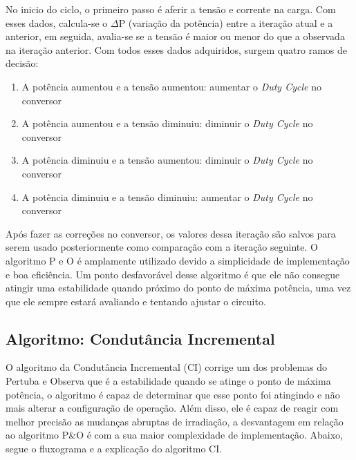 No inicio do ciclo, o primeiro passo é aferir a tensão e corrente na carga. Com esses dados, calcula-se o $\Delta$P (variação da potência) entre a iteração atual e a anterior, em seguida, avalia-se se a tensão é maior ou menor do que a observada na iteração anterior. Com todos esses dados adquiridos, surgem quatro ramos de decisão:
\begin{enumerate}
    \item A potência aumentou e a tensão aumentou: aumentar o \textit{Duty Cycle} no conversor 
    \item A potência aumentou e a tensão diminuiu: diminuir o \textit{Duty Cycle} no conversor
    \item A potência diminuiu e a tensão aumentou: diminuir o \textit{Duty Cycle} no conversor
    \item A potência diminuiu e a tensão diminuiu: aumentar o \textit{Duty Cycle} no conversor
\end{enumerate}

Após fazer as correções no conversor, os valores dessa iteração são salvos para serem usado posteriormente como comparação com a iteração seguinte. O algoritmo P e O é amplamente utilizado devido a simplicidade de implementação e boa eficiência. Um ponto desfavorável desse algoritmo é que ele não consegue atingir uma estabilidade quando próximo do ponto de máxima potência, uma vez que ele sempre estará avaliando e tentando ajustar o circuito.

\subsection*{Algoritmo: Condutância Incremental}

O algoritmo da Condutância Incremental (CI) corrige um dos problemas do Pertuba e Observa que é a estabilidade quando se atinge o ponto de máxima potência, o algoritmo é capaz de determinar que esse ponto foi atingindo e não mais alterar a configuração de operação. Além disso, ele é capaz de reagir com melhor precisão as mudanças abruptas de irradiação, a desvantagem em relação ao algoritmo P\&O é com a sua maior complexidade de implementação. Abaixo, segue o fluxograma e a explicação do algoritmo CI.

